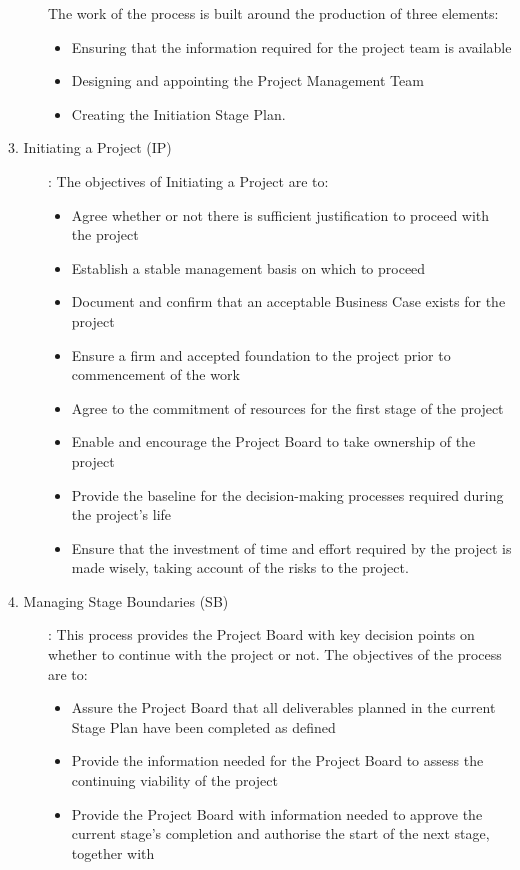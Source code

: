 \begin{minipage}[t]{0.5\linewidth}
\begin{description}
The work of the process is built around the production of three elements:
\begin{itemize}
\item Ensuring that the information required for the project team is available
\item Designing and appointing the Project Management Team
\item Creating the Initiation Stage Plan.
\end{itemize}
%
\ifslides
\newpage
\fi
\item[3. Initiating a Project (IP)]: The objectives of Initiating a Project are to:
  \begin{itemize}
  \item Agree whether or not there is sufficient justification to proceed with
  the project
\item Establish a stable management basis on which to proceed
\item Document and confirm that an acceptable Business Case exists for the
  project
\item Ensure a firm and accepted foundation to the project prior to
  commencement of the work
\item Agree to the commitment of resources for the first stage of the project
\item Enable and encourage the Project Board to take ownership of the project
\item Provide the baseline for the decision-making processes required during
  the project's life
\item Ensure that the investment of time and effort required by the project is
  made wisely, taking account of the risks to the project.
  \end{itemize}
\ifslides
\newpage
\fi
\item[4. Managing Stage Boundaries (SB)]:
This process provides the Project Board with key decision points on whether to
continue with the project or not. The objectives of the process are to:
\begin{itemize}
\item Assure the Project Board that all deliverables planned in the current
  Stage Plan have been completed as defined
\item Provide the information needed for the Project Board to assess the
  continuing viability of the project
\item Provide the Project Board with information needed to approve the current
  stage's completion and authorise the start of the next stage, together with

\end{itemize}
\end{description}
\end{minipage}
